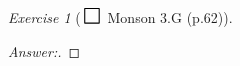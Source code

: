 \documentclass[12pt]{amsart}
\theoremstyle{remark}
\newtheorem*{exercise}{Exercise}%
\theoremstyle{mycomment}
\def\msquare{\mathord{\scalerel*{\Box}{gX}}}
\begin{document}
\begin{exercise}[$\msquare$ Monson 3.G (p.62)]
\begin{proof}[Answer:]
\end{proof}








\end{exercise}














 
\end{document}
